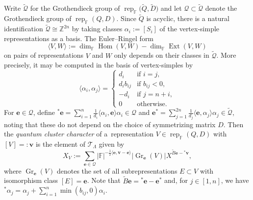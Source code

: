 \documentclass[pdftex]{sigma}
\newcommand{\bfe}{\mathbf{e}}
\newcommand{\bfv}{\mathbf{v}}
\newcommand{\cQ}{\mathcal{Q}}
\newcommand{\cT}{\mathcal{T}}
\newcommand{\FF}{\mathbb{F}}
\newcommand{\Ext}{\operatorname{Ext}}
\newcommand{\Gr}{\operatorname{Gr}}
\newcommand{\half}{{\frac{1}{2}}}
\newcommand{\Hom}{\operatorname{Hom}}
\newcommand{\rep}{\operatorname{rep}}
\newcommand{\ZZ}{\mathbb{Z}}
\numberwithin{equation}{section}
\begin{document}
Write $\widetilde{\cQ}$ for the Grothendieck group of $\rep_\FF\big(\widetilde{Q},\widetilde{D}\big)$ and let $\cQ\subset\widetilde{\cQ}$ denote the Grothendieck group of $\rep_\FF(Q,D)$. Since $\widetilde{Q}$ is acyclic, there is a natural identification $\widetilde{\cQ}\cong\ZZ^{2n}$ by taking classes $\alpha_i:=[S_i]$ of the vertex-simple representations as a basis. The Euler--Ringel form
 \[
 \langle V,W\rangle:=\dim_\FF\Hom(V,W)-\dim_\FF\Ext(V,W)
 \]
 on pairs of representations $V$ and $W$ only depends on their classes in $\widetilde{\cQ}$.
 More precisely, it may be computed in the basis of vertex-simples by
 \[
 \langle\alpha_i,\alpha_j\rangle
 =
 \begin{cases}
 d_i & \text{if $i=j$},\\
 d_ib_{ij} & \text{if $b_{ij}<0$},\\
 -d_i & \text{if $j=n+i$},\\
 0 & \text{otherwise}.
 \end{cases}
 \]
 For $\bfe\in\cQ$, define ${}^*\bfe=\sum\limits_{i=1}^n\frac{1}{d_i}\langle\alpha_i,\bfe\rangle\alpha_i\in\cQ$ and $\bfe^*=\sum\limits_{j=1}^{2n}\frac{1}{d_j}\langle\bfe,\alpha_j\rangle\alpha_j\in\widetilde{\cQ}$, noting that these do not depend on the choice of symmetrizing matrix $D$.
 Then the {\it quantum cluster character} of a~representation $V\in\rep_\FF(Q,D)$ with $[V]=:\bfv$ is the element of $\cT_\Lambda$ given by
 \[
 X_V := \sum\limits_{\bfe\in\cQ} |\FF|^{-\half\langle\bfe,\bfv-\bfe\rangle} |{\Gr}_\bfe(V) |X^{\widetilde{B}\bfe-{}^*\bfv},
 \]
 where $\Gr_\bfe(V)$ denotes the set of all subrepresentations $E\subset V$ with isomorphism class $[E]=\bfe$. Note that $\widetilde{B}\bfe={}^*\bfe-\bfe^*$ and, for $j\in[1,n]$, we have ${}^*\alpha_j=\alpha_j+\sum\limits_{i=1}^{n}\min(b_{ij},0)\alpha_i$.
\end{document}
